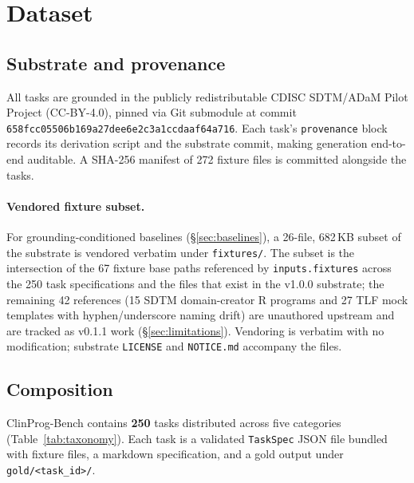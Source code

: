 \section{Dataset}
\label{sec:dataset}


\subsection{Substrate and provenance}

All tasks are grounded in the publicly redistributable CDISC SDTM/ADaM Pilot
Project (CC-BY-4.0), pinned via Git submodule at commit
\texttt{658fcc05506b169a27dee6e2c3a1ccdaaf64a716}. Each task's
\texttt{provenance} block records its derivation script and the substrate
commit, making generation end-to-end auditable. A SHA-256 manifest of 272
fixture files is committed alongside the tasks.

\paragraph{Vendored fixture subset.} For grounding-conditioned baselines
(\S\ref{sec:baselines}), a 26-file, 682\,KB subset of the substrate is
vendored verbatim under \texttt{fixtures/}. The subset is the
intersection of the 67 fixture base paths referenced by
\texttt{inputs.fixtures} across the 250 task specifications and the
files that exist in the v1.0.0 substrate; the remaining 42 references
(15 SDTM domain-creator R programs and 27 TLF mock templates with
hyphen/underscore naming drift) are unauthored upstream and are tracked
as v0.1.1 work (\S\ref{sec:limitations}). Vendoring is verbatim with no
modification; substrate \texttt{LICENSE} and \texttt{NOTICE.md} accompany
the files.

\subsection{Composition}

ClinProg-Bench contains \textbf{250} tasks distributed across five categories
(Table~\ref{tab:taxonomy}). Each task is a validated \texttt{TaskSpec} JSON
file bundled with fixture files, a markdown specification, and a gold output
under \texttt{gold/<task\_id>/}.

